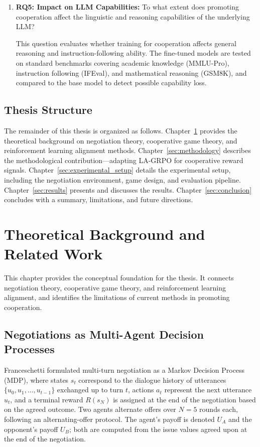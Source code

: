 \documentclass[12pt,a4paper]{article}
\begin{document}
\begin{enumerate}[label={}, leftmargin=0pt, itemsep=1.2em]
    \item \textbf{RQ5: Impact on LLM Capabilities:} To what extent does promoting cooperation affect the linguistic and reasoning capabilities of the underlying LLM?
    \par This question evaluates whether training for cooperation affects general reasoning and instruction-following ability. The fine-tuned models are tested on standard benchmarks covering academic knowledge (MMLU-Pro), instruction following (IFEval), and mathematical reasoning (GSM8K), and compared to the base model to detect possible capability loss.
\end{enumerate}


\subsection{Thesis Structure}
The remainder of this thesis is organized as follows. Chapter~\ref{sec:background} provides the theoretical background on negotiation theory, cooperative game theory, and reinforcement learning alignment methods. Chapter~\ref{sec:methodology} describes the methodological contribution---adapting LA-GRPO for cooperative reward signals. Chapter~\ref{sec:experimental_setup} details the experimental setup, including the negotiation environment, game design, and evaluation pipeline. Chapter~\ref{sec:results} presents and discusses the results. Chapter~\ref{sec:conclusion} concludes with a summary, limitations, and future directions.


\newpage
\section{Theoretical Background and Related Work}
\label{sec:background}

This chapter provides the conceptual foundation for the thesis. It connects negotiation theory, cooperative game theory, and reinforcement learning alignment, and identifies the limitations of current methods in promoting cooperation.

\subsection{Negotiations as Multi-Agent Decision Processes}

Franceschetti formulated multi-turn negotiation as a Markov Decision Process (MDP), where states $s_t$ correspond to the dialogue history of utterances $\{u_0, u_1, \ldots, u_{t-1}\}$ exchanged up to turn $t$, actions $a_t$ represent the next utterance $u_t$, and a terminal reward $R(s_N)$ is assigned at the end of the negotiation based on the agreed outcome. Two agents alternate offers over $N=5$ rounds each, following an alternating-offer protocol. The agent's payoff is denoted $U_A$ and the opponent's payoff $U_B$; both are computed from the issue values agreed upon at the end of the negotiation.
\end{document}
